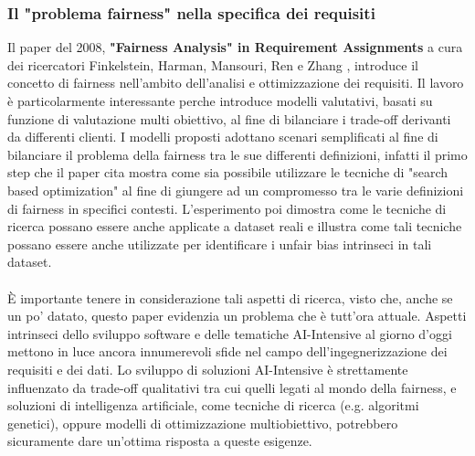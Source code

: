 \subsubsection{Il "problema fairness" nella specifica dei requisiti}
Il paper del 2008, \textbf{"Fairness Analysis" in Requirement Assignments} a cura dei ricercatori Finkelstein, Harman, Mansouri, Ren e Zhang \cite{finkelstein2008fairness}, introduce il concetto di fairness nell'ambito dell'analisi e ottimizzazione dei requisiti. Il lavoro è particolarmente interessante perche introduce modelli valutativi, basati su funzione di valutazione multi obiettivo, al fine di bilanciare i trade-off derivanti da differenti clienti. I modelli proposti adottano scenari semplificati al fine di bilanciare il problema della fairness tra le sue differenti definizioni, infatti il primo step che il paper cita mostra come sia possibile utilizzare le tecniche di "search based optimization" al fine di giungere ad un compromesso tra le varie definizioni di fairness in specifici contesti. L'esperimento poi dimostra come le tecniche di ricerca possano essere anche applicate a dataset reali e illustra come tali tecniche possano essere anche utilizzate per identificare i unfair bias intrinseci in tali dataset. \\ \\
È importante tenere in considerazione tali aspetti di ricerca, visto che, anche se un po' datato, questo paper evidenzia un problema che è tutt'ora attuale. Aspetti intrinseci dello sviluppo software e delle tematiche AI-Intensive al giorno d'oggi mettono in luce ancora innumerevoli sfide nel campo dell'ingegnerizzazione dei requisiti e dei dati. Lo sviluppo di soluzioni AI-Intensive è strettamente influenzato da trade-off qualitativi tra cui quelli legati al mondo della fairness, e soluzioni di intelligenza artificiale, come tecniche di ricerca (e.g. algoritmi genetici), oppure modelli di ottimizzazione multiobiettivo, potrebbero sicuramente dare un'ottima risposta a queste esigenze.

